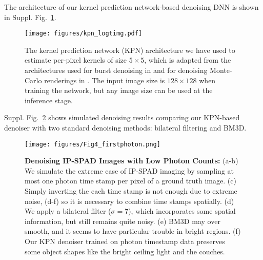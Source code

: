The architecture of our kernel prediction network-based denoising DNN is
shown in Suppl. Fig.~\ref{fig:kpn_logtimg}.

\begin{figure}[!htb]
    \centering
    \texttt{[image: figures/kpn\_logtimg.pdf]}
    \caption{The kernel prediction network (KPN) architecture we have used to
      estimate per-pixel kernels of size $5 \times 5$, which is adapted from
      the architectures used for burst denoising in \cite{burstkpn_2018} and
      for denoising Monte-Carlo renderings in \cite{kpn_2017}. The input image
    size is $128 \times 128$ when training the network, but any image size can
    be used at the inference stage.}
    \label{fig:kpn_logtimg}
\end{figure}

Suppl. Fig.~\ref{fig:passive_first_photon} shows simulated denoising results
comparing our KPN-based denoiser with two standard denoising methods: bilateral
filtering and BM3D.
\begin{figure}[!htb]
  \centering
  \texttt{[image: figures/Fig4\_firstphoton.png]}
  \caption{\textbf{Denoising IP-SPAD Images with Low Photon Counts:} (a-b) We simulate
  the extreme case of IP-SPAD imaging by sampling at most one photon
  time stamp per pixel of a ground truth image. (c) Simply inverting the each
  time stamp is not enough due to extreme noise, (d-f) so it is necessary to
  combine time stamps spatially. (d) We apply a bilateral filter ($\sigma=7$),
  which incorporates some spatial information, but still remains quite noisy.
  (e) BM3D \cite{Kostadin2006} may over smooth, and it seems to have particular
  trouble in bright regions. (f) Our KPN denoiser trained on photon timestamp
  data preserves some object shapes like the bright ceiling light and the
  couches.
  \label{fig:passive_first_photon}}
\end{figure}


